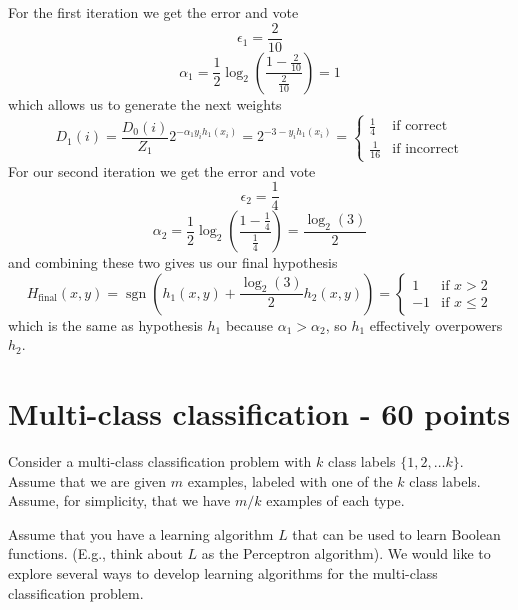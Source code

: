 \documentclass[12pt]{article}
\begin{document}
For the first iteration we get the error and vote
\[\epsilon_1 = \frac{2}{10}\]
\[\alpha_1 = \frac{1}{2}\log_2\left(\frac{1-\frac{2}{10}}{\frac{2}{10}}\right) = 1\]
which allows us to generate the next weights
\[D_1(i)=\frac{D_0(i)}{Z_1}2^{-\alpha_1y_ih_1(x_i)}=2^{-3-y_ih_1(x_i)}=\begin{cases}\frac{1}{4}&\text{if correct}\\ \frac{1}{16}&\text{if incorrect}\end{cases}\]
For our second iteration we get the error and vote
\[\epsilon_2 = \frac{1}{4}\]
\[\alpha_2 = \frac{1}{2}\log_2\left(\frac{1-\frac{1}{4}}{\frac{1}{4}}\right) = \frac{\log_2(3)}{2}\]
and combining these two gives us our final hypothesis
\[H_\text{final}(x,y)=\operatorname{sgn}\left(h_1(x,y)+\frac{\log_2(3)}{2}h_2(x,y)\right)=\begin{cases}1&\text{if }x>2\\ -1&\text{if }x\leq 2\end{cases}\]
which is the same as hypothesis \(h_1\) because \(\alpha_1>\alpha_2\), so \(h_1\) effectively overpowers \(h_2\).

\section{Multi-class classification - 60 points}

Consider a multi-class classification problem with $k$ class
labels $\{1, 2, \ldots k\}$. Assume that we are given $m$
examples, labeled with one of the $k$ class labels. Assume, for
simplicity, that we have $m/k$ examples of each type.

Assume that you have a learning algorithm $L$ that can be used
to learn Boolean functions. (E.g., think about $L$ as the
Perceptron algorithm). We would like to explore several ways to
develop learning algorithms for the multi-class classification
problem.
\end{document}
